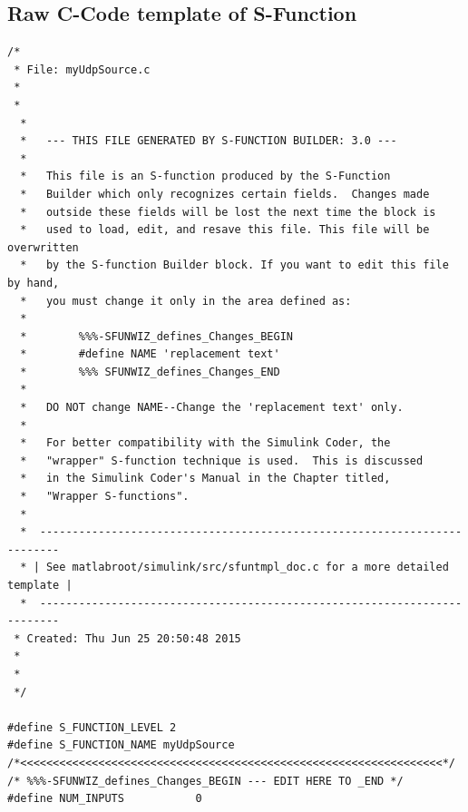 \subsection{Raw C-Code template of S-Function}
\label{sec:c-sFunc-Code:rawTemplate}
\begin{lstlisting}[caption={[C-Code template 'myUdpSource.c' generated by the S-Function Builder]Complete C-Code template file 'myUdpSource.c' generated by the S-Function Builder according to the example shown in chapter \ref{sec:udpMatlab:simulinkBlock:builder}},label=code:c-sFunc-Code:rawTemplate]
/*
 * File: myUdpSource.c
 *
 *
  *
  *   --- THIS FILE GENERATED BY S-FUNCTION BUILDER: 3.0 ---
  *
  *   This file is an S-function produced by the S-Function
  *   Builder which only recognizes certain fields.  Changes made
  *   outside these fields will be lost the next time the block is
  *   used to load, edit, and resave this file. This file will be overwritten
  *   by the S-function Builder block. If you want to edit this file by hand, 
  *   you must change it only in the area defined as:  
  *
  *        %%%-SFUNWIZ_defines_Changes_BEGIN
  *        #define NAME 'replacement text' 
  *        %%% SFUNWIZ_defines_Changes_END
  *
  *   DO NOT change NAME--Change the 'replacement text' only.
  *
  *   For better compatibility with the Simulink Coder, the
  *   "wrapper" S-function technique is used.  This is discussed
  *   in the Simulink Coder's Manual in the Chapter titled,
  *   "Wrapper S-functions".
  *
  *  -------------------------------------------------------------------------
  * | See matlabroot/simulink/src/sfuntmpl_doc.c for a more detailed template |
  *  ------------------------------------------------------------------------- 
 * Created: Thu Jun 25 20:50:48 2015
 * 
 *
 */

#define S_FUNCTION_LEVEL 2
#define S_FUNCTION_NAME myUdpSource
/*<<<<<<<<<<<<<<<<<<<<<<<<<<<<<<<<<<<<<<<<<<<<<<<<<<<<<<<<<<<<<<<<<*/
/* %%%-SFUNWIZ_defines_Changes_BEGIN --- EDIT HERE TO _END */
#define NUM_INPUTS           0


\end{lstlisting}
